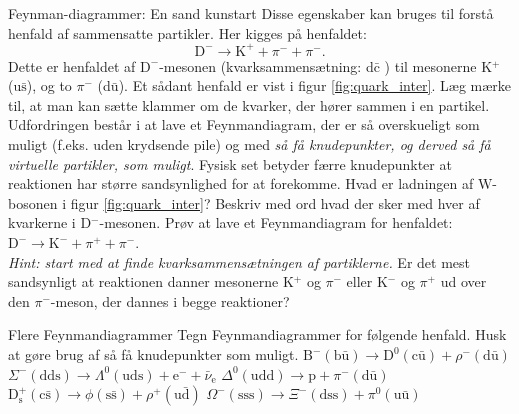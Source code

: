 \begin{opgave}{Feynman-diagrammer: En sand kunstart}
    Disse egenskaber kan bruges til forstå henfald af sammensatte partikler. Her kigges på henfaldet:
    \begin{equation*}
        \text{D}^- \rightarrow \text{K}^+ + \pi^- + \pi^-.
    \end{equation*}
    Dette er henfaldet af $\text{D}^-$-mesonen (kvarksammensætning: d$\bar{\text{c}}$ ) til mesonerne K$^+$ (u$\bar{\text{s}}$), og to $\pi^-$ (d$\bar{\text{u}}$). Et sådant henfald er vist i figur \ref{fig:quark_inter}. Læg mærke til, at man kan sætte klammer om de kvarker, der hører sammen i en partikel.
    Udfordringen består i at lave et Feynmandiagram, der er så overskueligt som muligt (f.eks. uden krydsende pile) og med \emph{så få knudepunkter, og derved så få virtuelle partikler, som muligt}. Fysisk set betyder færre knudepunkter at reaktionen har større sandsynlighed for at forekomme.
    \opg Hvad er ladningen af $\mathrm{W}$-bosonen i figur \ref{fig:quark_inter}?
    \opg Beskriv med ord hvad der sker med hver af kvarkerne i D$^-$-mesonen.
    \opg Prøv at lave et Feynmandiagram for henfaldet: $\text{D}^- \rightarrow \text{K}^- + \pi^+ + \pi^-$. \\
    \emph{Hint: start med at finde kvarksammensætningen af partiklerne.}
    \opg Er det mest sandsynligt at reaktionen danner mesonerne K$^+$ og $\pi^-$ eller K$^-$ og $\pi^+$ ud over den $\pi^-$-meson, der dannes i begge reaktioner?
\end{opgave}

\begin{opgave}{Flere Feynmandiagrammer} \label{opg:flere_feynman}
    Tegn Feynmandiagrammer for følgende henfald. Husk at gøre brug af så få knudepunkter som muligt.
    \opg $\text{B}^- (\mathrm b\bar{\mathrm u}) \longrightarrow \text{D}^0(\mathrm c\bar{\mathrm u}) + \rho^-(\mathrm d\bar{\mathrm u})$
    \opg $\Sigma^-(\mathrm{dds}) \longrightarrow \Lambda^0 (\mathrm{uds}) + \mathrm{e}^- + \bar{\nu}_\mathrm{e}$
    \opg $\Delta^0 (\mathrm{udd}) \longrightarrow \mathrm{p} + \pi^- (\mathrm d\bar{\mathrm u})$
    \opg $\text{D}_\mathrm{s}^+ (\mathrm c\bar{\mathrm s}) \longrightarrow \phi (\mathrm s\bar{\mathrm s}) + \rho^+ (\mathrm u\bar{\mathrm d})$
    \opg $\Omega^-(\mathrm{sss}) \longrightarrow \Xi^-(\mathrm{dss}) + \pi^0(\mathrm u\bar{\mathrm u})$
\end{opgave}

